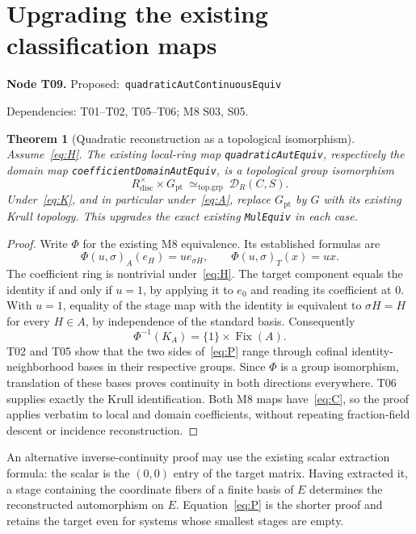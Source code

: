 \documentclass[11pt]{article}
\newtheorem{theorem}{Theorem}[section]
\theoremstyle{remark}\newtheorem{remark}[theorem]{Remark}
\newcommand{\Fix}{\operatorname{Fix}}
\newcommand{\D}{\mathcal D}
\newcommand{\code}[1]{{\normalfont\nolinkurl{#1}}}
\newcommand{\node}[3]{\par\Needspace{8\baselineskip}\smallskip\noindent\textbf{Node #1.}\quad
 \textsf{Proposed:}\ \code{#2}\par\noindent
 \textsf{Dependencies:} #3.\par\smallskip}
\begin{document}
\section{Upgrading the existing classification maps}
\label{sec:classification}

\node{T09}{quadraticAutContinuousEquiv}{T01--T02, T05--T06; M8 S03, S05}
\begin{theorem}[Quadratic reconstruction as a topological isomorphism]\label{thm:t09}
Assume~\eqref{eq:H}. The existing local-ring map
\code{quadraticAutEquiv}, respectively the domain map
\code{coefficientDomainAutEquiv}, is a topological group isomorphism
\[
       R^\times_{\mathrm{disc}}\times G_{\mathrm{pt}}
                         \ \simeq_{\mathrm{top.grp}}\ \D_R(C,S).
\]
Under~\eqref{eq:K}, and in particular under~\eqref{eq:A}, replace
$G_{\mathrm{pt}}$ by $G$ with its existing Krull topology. This
upgrades the exact existing \code{MulEquiv} in each case.
\end{theorem}
\begin{proof}
Write $\Phi$ for the existing M8 equivalence. Its established formulas
are
\[
 \Phi(u,\sigma)_A(e_H)=u e_{\sigma H},\qquad
 \Phi(u,\sigma)_T(x)=u x.                                    \tag{C}\label{eq:C}
\]
The coefficient ring is nontrivial under~\eqref{eq:H}. The target
component equals the identity if and only if $u=1$, by applying it to
$e_0$ and reading its coefficient at $0$. With $u=1$, equality of the
stage map with the identity is equivalent to $\sigma H=H$ for every
$H\in A$, by independence of the standard basis. Consequently
\[
                    \Phi^{-1}(K_A)=\{1\}\times\Fix(A).        \tag{P}\label{eq:P}
\]
T02 and T05 show that the two sides of~\eqref{eq:P} range through
cofinal identity-neighborhood bases in their respective groups. Since
$\Phi$ is a group isomorphism, translation of these bases proves
continuity in both directions everywhere. T06 supplies exactly the
Krull identification. Both M8 maps have~\eqref{eq:C}, so the proof
applies verbatim to local and domain coefficients, without repeating
fraction-field descent or incidence reconstruction.
\end{proof}

An alternative inverse-continuity proof may use the existing scalar
extraction formula: the scalar is the $(0,0)$ entry of the target
matrix. Having extracted it, a stage containing the coordinate fibers
of a finite basis of $E$ determines the reconstructed automorphism on
$E$. Equation~\eqref{eq:P} is the shorter proof and retains the target
even for systems whose smallest stages are empty.
\end{document}
